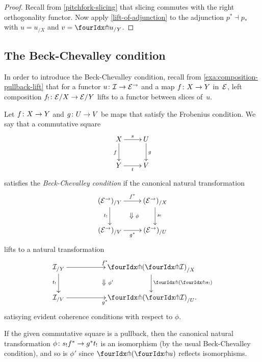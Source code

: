 \documentclass[reqno,10pt,a4paper,oneside,draft]{amsart}
\begin{document}
\begin{proof}
Recall from \cref{pitchfork-slicing} that slicing commutes with the right orthogonality functor.
Now apply \cref{lift-of-adjunction} to the adjunction $p^* \dashv p_*$ with $u = u_{/X}$ and $v = {\liftr{u}}_{/Y}$.
\end{proof}

\subsection*{The Beck-Chevalley condition}

In order to introduce the Beck-Chevalley condition, recall from \cref{exa:composition-pullback-lift} that for a functor $u \colon \mathcal{I} \to \mathcal{E}^\to$ and a map $f \colon X \to Y$ in~$\mathcal{E}$, left composition $f_! \colon \mathcal{E}/X \to \mathcal{E}/Y$ lifts to a functor between slices of~$u$.

\begin{definition} \label{def:beck-chevalley}
Let $f \colon X \to Y$ and $g \colon U \to V$ be maps that satisfy the Frobenius condition.
We say that a commutative square
\[
\xymatrix{
  X
  \ar[d]_{f}
  \ar[r]^{s}
&
  U
  \ar[d]^{g}
\\
  Y
  \ar[r]_{t}
&
  V
}
\]
satisfies the \emph{Beck-Chevalley condition} if the canonical natural transformation
\[
\xymatrix{
  (\catE^\to)_{/Y}
   \ar[d]_{t_!}
  \ar[r]^{f^*}
  \ar@{}[dr]|{\textstyle\Downarrow \rlap{$\labelstyle\phi$}}
&
  (\catE^\to)_{/X}
  \ar[d]^{s_!}
\\
  (\catE^\to)_{/V}
  \ar[r]_{g^*}
&
  (\catE^\to)_{/U}
}
\]
lifts to a natural transformation
\[
\xymatrix@C+3em{
   \cal{I}_{/Y}
    \ar[r]^{f^*}
     \ar[d]_{t_!}
  \ar@{}[dr]|{\textstyle\Downarrow \rlap{$\labelstyle\phi'$}}
   &
  {\liftl{(\liftr{\cal{I}})}}_{/X}
  \ar[d]^{\liftl{(\liftr{s_!})}} \\
  \cal{I}_{/V}
   \ar[r]_{g^*}
 &
   {\liftl{(\liftr{\cal{I}})}}_{/U} \rlap{.}
}
\]
satisying evident coherence conditions with respect to $\phi$.
\end{definition}

\begin{remark}
If the given commutative square is a pullback, then the canonical natural transformation $\phi \colon s_! f^* \to g^* t_!$ is an isomorphism (by the usual Beck-Chevalley condition), and so is $\phi'$ since $\liftl{(\liftr{u})}$ reflects isomorphisms.
\end{remark}
\end{document}
